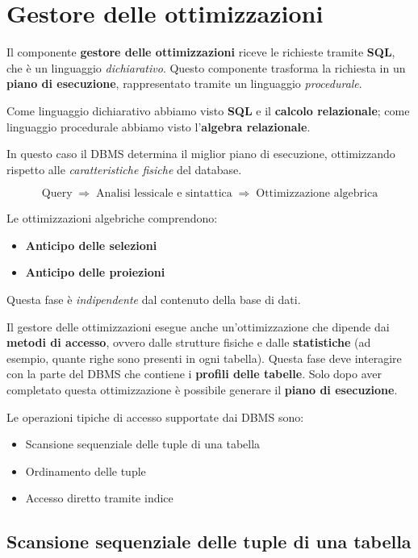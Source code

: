 \section{Gestore delle ottimizzazioni}

Il componente \textbf{gestore delle ottimizzazioni} riceve le richieste tramite \textbf{SQL}, che è un linguaggio \textit{dichiarativo}. Questo componente trasforma la richiesta in un \textbf{piano di esecuzione}, rappresentato tramite un linguaggio \textit{procedurale}.

Come linguaggio dichiarativo abbiamo visto \textbf{SQL} e il \textbf{calcolo relazionale}; come linguaggio procedurale abbiamo visto l'\textbf{algebra relazionale}.

In questo caso il DBMS determina il miglior piano di esecuzione, ottimizzando rispetto alle \textit{caratteristiche fisiche} del database.

\[
\text{Query}
\;\Rightarrow\;
\text{Analisi lessicale e sintattica}
\;\Rightarrow\;
\text{Ottimizzazione algebrica}
\]

Le ottimizzazioni algebriche comprendono:
\begin{itemize}
	\item \textbf{Anticipo delle selezioni}
	\item \textbf{Anticipo delle proiezioni}
\end{itemize}

Questa fase è \textit{indipendente} dal contenuto della base di dati.

Il gestore delle ottimizzazioni esegue anche un'ottimizzazione che dipende dai \textbf{metodi di accesso}, ovvero dalle strutture fisiche e dalle \textbf{statistiche} (ad esempio, quante righe sono presenti in ogni tabella). Questa fase deve interagire con la parte del DBMS che contiene i \textbf{profili delle tabelle}. Solo dopo aver completato questa ottimizzazione è possibile generare il \textbf{piano di esecuzione}.

\bigskip
\noindent Le operazioni tipiche di accesso supportate dai DBMS sono:
\begin{itemize}
	\item Scansione sequenziale delle tuple di una tabella
	\item Ordinamento delle tuple
	\item Accesso diretto tramite indice
\end{itemize}

\subsection{Scansione sequenziale delle tuple di una tabella}

